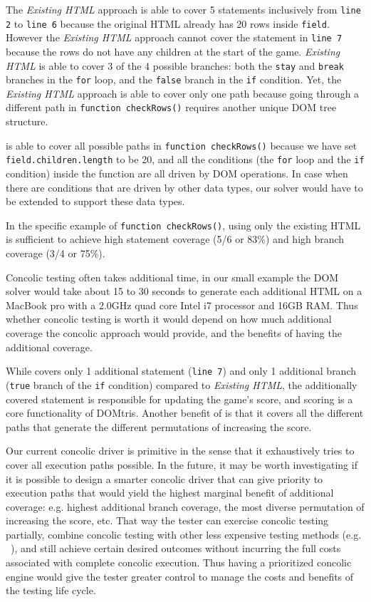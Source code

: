 The {\em Existing HTML} approach is able to cover 5 statements inclusively from {\tt line 2} to {\tt line 6} because the original HTML already has 20 rows inside {\tt field}.  
However the {\em Existing HTML} approach cannot cover the statement in {\tt line 7} because the rows do not have any children at the start of the game. 
{\em Existing HTML} is able to cover 3 of the 4 possible branches: both the {\tt stay} and {\tt break} branches in the {\tt for} loop, and the {\tt false} branch in the {\tt if} condition. 
Yet, the {\em Existing HTML} approach is able to cover only one path because going through a different path in {\tt function checkRows()} requires another unique DOM tree structure.  

\tool is able to cover all possible paths in {\tt function checkRows()} because we have set {\tt field.children.length} to be 20, 
and all the conditions (the {\tt for} loop and the {\tt if} condition) inside the function are all driven by DOM operations.  
In case when there are conditions that are driven by other data types, our solver would have to be extended to support these data types.    

In the specific example of {\tt function checkRows()}, using only the existing HTML is sufficient to achieve high statement coverage (5/6 or 83\%) and high branch coverage (3/4 or 75\%).  

Concolic testing often takes additional time, in our small example the DOM solver would take about 15 to 30 seconds to generate each additional HTML on a MacBook pro with a 2.0GHz quad core Intel i7 processor and 16GB RAM.
Thus whether concolic testing is worth it would depend on how much additional coverage the concolic approach would provide, and the benefits of having the additional coverage.  

While \tool covers only 1 additional statement ({\tt line 7}) and only 1 additional branch ({\tt true} branch of the {\tt if} condition) compared to {\em Existing HTML}, 
the additionally covered statement is responsible for updating the game's score, and scoring is a core functionality of DOMtris.  
Another benefit of \tool is that it covers all the different paths that generate the different permutations of increasing the score.  

Our current concolic driver is primitive in the sense that it exhaustively tries to cover all execution paths possible.  
In the future, it may be worth investigating if it is possible to design a smarter concolic driver that can give priority to execution paths that would yield the highest marginal benefit of additional coverage: 
e.g. highest additional branch coverage, the most diverse permutation of increasing the score, etc.  
That way the tester can exercise concolic testing partially, combine concolic testing with other less expensive testing methods (e.g. ~\cite{hybridconcolic}), and still achieve certain desired outcomes without incurring the full costs associated with complete concolic execution.  
Thus having a prioritized concolic engine would give the tester greater control to manage the costs and benefits of the testing life cycle.  

